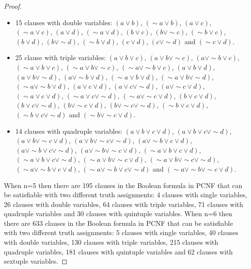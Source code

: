 \documentclass[runningheads,a4paper]{llncs}
\let\oldsim\sim
\renewcommand{\sim}{{\oldsim}}
\begin{document}
\begin{theorem}
\begin{proof}
\begin{itemize}
\begin{itemize}
    \item 15 clauses with double variables: $({a}\vee {b})$, $(\sim {a}\vee {b})$, $({a}\vee {c})$, $(\sim {a}\vee {c})$, $({a}\vee {d})$, $(\sim {a}\vee {d})$, $({b}\vee {c})$, $({b}\vee \sim {c})$, $(\sim {b}\vee {c})$, $({b}\vee {d})$, $({b}\vee \sim {d})$, $(\sim {b}\vee {d})$, $({c}\vee {d})$, $({c}\vee \sim {d})$ and $(\sim {c}\vee {d})$.
    \item 25 clause with triple variables: 
$({a}\vee {b} \vee {c})$, $({a}\vee {b} \vee \sim {c})$, $({a}\vee \sim {b} \vee {c})$, 
$(\sim {a}\vee {b} \vee {c})$, $(\sim {a}\vee {b} \vee \sim {c})$, $( \sim {a}\vee \sim {b} \vee {c})$, 
$({a}\vee {b} \vee {d})$, $({a}\vee {b} \vee \sim {d})$, $({a}\vee \sim {b} \vee {d})$, $(\sim {a}\vee {b} \vee {d})$, $(\sim {a}\vee {b} \vee \sim {d})$, $( \sim {a}\vee \sim {b} \vee {d})$, 
$({a}\vee {c} \vee {d})$, $({a}\vee {c} \vee \sim {d})$, $({a}\vee \sim {c} \vee {d})$, $(\sim {a}\vee {c} \vee {d})$, $(\sim {a}\vee {c} \vee \sim {d})$, $( \sim {a}\vee \sim {c} \vee {d})$,
$({b}\vee {c} \vee {d})$, $({b}\vee {c} \vee \sim {d})$, $({b}\vee \sim {c} \vee {d})$, $({b}\vee \sim {c} \vee \sim {d})$, $(\sim {b}\vee {c} \vee {d})$, $(\sim {b}\vee {c} \vee \sim  {d})$ and $(\sim {b}\vee \sim {c} \vee {d})$.
   \item 14 clauses with quadruple variables:
$({a}\vee {b} \vee {c} \vee {d})$, $({a}\vee {b} \vee {c} \vee \sim {d})$, 
$({a}\vee {b} \vee \sim {c} \vee {d})$, $({a}\vee {b} \vee \sim {c} \vee \sim {d})$, 
$({a}\vee \sim{b} \vee {c} \vee {d})$, $({a}\vee \sim{b} \vee {c} \vee \sim {d})$, 
$({a}\vee \sim{b} \vee \sim {c} \vee {d})$, $(\sim {a}\vee {b} \vee {c} \vee {d})$, 
$(\sim {a}\vee {b} \vee {c} \vee \sim {d})$, $(\sim {a}\vee {b} \vee \sim {c} \vee {d})$, 
$(\sim {a}\vee {b} \vee \sim {c} \vee \sim {d})$, $(\sim {a}\vee \sim{b} \vee {c} \vee {d})$, 
$( \sim{a}\vee \sim{b} \vee {c} \vee \sim {d})$ and $(\sim {a}\vee \sim{b} \vee \sim {c} \vee {d})$.
    \end{itemize}
\end{itemize}

When n=5 then there are 195 clauses in the Boolean formula in PCNF that can be satisfiable with two different truth assignments: 4 clauses with single variables, 26 clauses with double variables, 64 clauses with triple variables, 71 clauses with quadruple variables and 30 clauses with quintuple variables. When n=6 then there are 633 clauses in the Boolean formula in PCNF that can be satisfiable with two different truth assignments: 5 clauses with single variables, 40 clauses with double variables, 130 clauses with triple variables, 215 clauses with quadruple variables, 181 clauses with quintuple variables and 62 clauses with sextuple variables. 


\end{proof}
\end{theorem}
\end{document}
